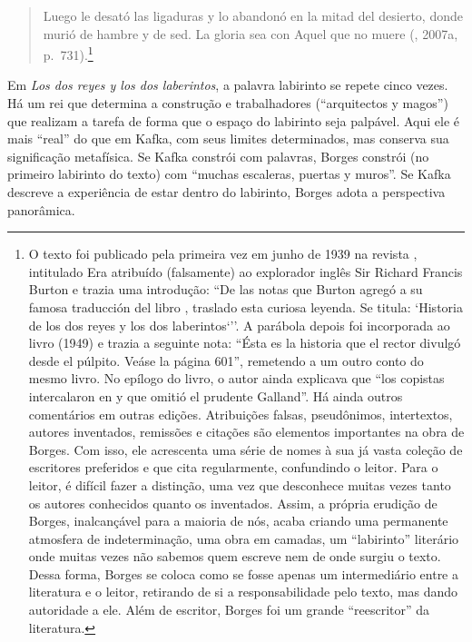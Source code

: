 \begin{quote}
Luego le desató las ligaduras y lo abandonó en la mitad del desierto,
donde murió de hambre y de sed. La gloria sea con Aquel que no muere
(, 2007a, p.~731).\footnote{O texto foi publicado pela primeira
  vez em junho de 1939 na revista {}, intitulado {} Era atribuído (falsamente) ao explorador inglês Sir
  Richard Francis Burton e trazia uma introdução: ``De las notas que
  Burton agregó a su famosa traducción del libro {}, traslado esta curiosa leyenda. Se titula: `Historia de los
  dos reyes y los dos laberintos`''. A parábola depois foi incorporada
  ao livro {} (1949) e trazia a seguinte nota: ``Ésta es la
  historia que el rector divulgó desde el púlpito. Veáse la página
  601'', remetendo a um outro conto do mesmo livro. No epílogo do livro,
  o autor ainda explicava que ``los copistas intercalaron en {} y que omitió el prudente Galland''. Há ainda outros
  comentários em outras edições. Atribuições falsas, pseudônimos,
  intertextos, autores inventados, remissões e citações são elementos
  importantes na obra de Borges. Com isso, ele acrescenta uma série de
  nomes à sua já vasta coleção de escritores preferidos e que cita
  regularmente, confundindo o leitor. Para o leitor, é difícil fazer a
  distinção, uma vez que desconhece muitas vezes tanto os autores
  conhecidos quanto os inventados. Assim, a própria erudição de Borges,
  inalcançável para a maioria de nós, acaba criando uma permanente
  atmosfera de indeterminação, uma obra em camadas, um ``labirinto''
  literário onde muitas vezes não sabemos quem escreve nem de onde
  surgiu o texto. Dessa forma, Borges se coloca como se fosse apenas um
  intermediário entre a literatura e o leitor, retirando de si a
  responsabilidade pelo texto, mas dando autoridade a ele. Além de
  escritor, Borges foi um grande ``reescritor'' da literatura.}
\end{quote}

Em \emph{Los dos reyes y los dos laberintos}, a palavra labirinto se
repete cinco vezes. Há um rei que determina a construção e
trabalhadores (``arquitectos y magos'') que realizam a tarefa
de forma que o espaço do labirinto seja palpável. Aqui ele é mais
``real'' do que em Kafka, com seus limites determinados, mas conserva
sua significação metafísica. Se Kafka constrói com palavras, Borges
constrói (no primeiro labirinto do texto) com ``muchas escaleras,
puertas y muros''. Se Kafka descreve a experiência de estar dentro do
labirinto, Borges adota a perspectiva panorâmica.

